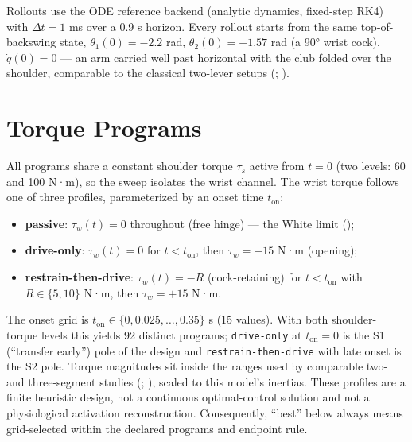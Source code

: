 \documentclass[
  letterpaper,
]{report}
\providecommand{\tightlist}{%
  \setlength{\itemsep}{0pt}\setlength{\parskip}{0pt}}
\begin{document}
Rollouts use the ODE reference backend (analytic dynamics, fixed-step
RK4) with \(\Delta t = 1\) ms over a 0.9 s horizon. Every rollout starts
from the same top-of-backswing state, \(\theta_1(0) = -2.2\) rad,
\(\theta_2(0) = -1.57\) rad (a 90° wrist cock), \(\dot q(0) = 0\) --- an
arm carried well past horizontal with the club folded over the shoulder,
comparable to the classical two-lever setups
(;
).

\section{Torque Programs}\label{sec-methods-programs}

All programs share a constant shoulder torque \(\tau_s\) active from
\(t=0\) (two levels: 60 and 100 N·m), so the sweep isolates the wrist
channel. The wrist torque follows one of three profiles, parameterized
by an onset time \(t_{\mathrm{on}}\):

\begin{itemize}
\tightlist
\item
  \textbf{passive}: \(\tau_w(t) = 0\) throughout (free hinge) --- the
  White limit ();
\item
  \textbf{drive-only}: \(\tau_w(t) = 0\) for \(t < t_{\mathrm{on}}\),
  then \(\tau_w = +15\) N·m (opening);
\item
  \textbf{restrain-then-drive}: \(\tau_w(t) = -R\) (cock-retaining) for
  \(t < t_{\mathrm{on}}\) with \(R \in \{5, 10\}\) N·m, then
  \(\tau_w = +15\) N·m.
\end{itemize}

The onset grid is \(t_{\mathrm{on}} \in \{0, 0.025, \dots, 0.35\}\) s
(15 values). With both shoulder-torque levels this yields 92 distinct
programs; \texttt{drive-only} at \(t_{\mathrm{on}} = 0\) is the S1
(``transfer early'') pole of the design and \texttt{restrain-then-drive}
with late onset is the S2 pole. Torque magnitudes sit inside the ranges
used by comparable two- and three-segment studies
(;
), scaled to
this model's inertias. These profiles are a finite heuristic design, not
a continuous optimal-control solution and not a physiological activation
reconstruction. Consequently, ``best'' below always means grid-selected
within the declared programs and endpoint rule.
\end{document}
